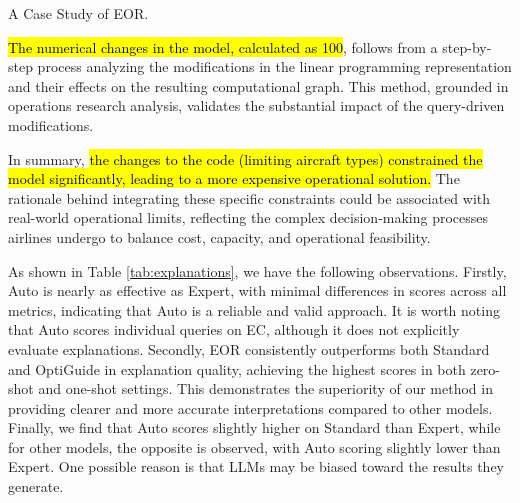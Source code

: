 \begin{figure*}[t]
\begin{AIbox}{A Case Study of EOR.}
{\hl{The numerical changes in the model, calculated as 100}, follows from a step-by-step process analyzing the modifications in the linear programming representation and their effects on the resulting computational graph. This method, grounded in operations research analysis, validates the substantial impact of the query-driven modifications.

In summary, \hl{the changes to the code (limiting aircraft types) constrained the model significantly, leading to a more expensive operational solution.} The rationale behind integrating these specific constraints could be associated with real-world operational limits, reflecting the complex decision-making processes airlines undergo to balance cost, capacity, and operational feasibility.
}
\end{AIbox}
\caption{An example illustrating the code and explanations generated by EOR.}
\vspace{-10pt}
\label{fig:explaiations_vs}
\end{figure*}

As shown in Table \ref{tab:explanations}, we have the following observations. Firstly, Auto is nearly as effective as Expert, with minimal differences in scores across all metrics, indicating that Auto is a reliable and valid approach. It is worth noting that Auto scores individual queries on EC, although it does not explicitly evaluate explanations. Secondly, EOR consistently outperforms both Standard and OptiGuide in explanation quality, achieving the highest scores in both zero-shot and one-shot settings. This demonstrates the superiority of our method in providing clearer and more accurate interpretations compared to other models. Finally, we find that Auto scores slightly higher on Standard than Expert, while for other models, the opposite is observed, with Auto scoring slightly lower than Expert. One possible reason is that LLMs may be biased toward the results they generate.

